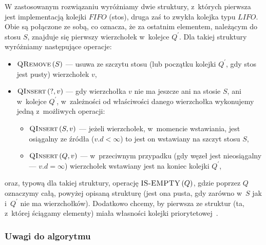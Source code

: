 W zastosowanym rozwiązaniu wyróżniamy dwie struktury, z~których pierwsza jest implementacją kolejki $FIFO$ (stos), druga zaś to zwykła kolejka typu $LIFO$. Obie są połączone ze sobą, co oznacza, że za ostatnim elementem, należącym do stosu $S$, znajduje się pierwszy wierzchołek w~kolejce $Q^{'}$. Dla takiej struktury wyróżniamy następujące operacje:

\begin{itemize}
\item $\textrm{\textsc{QRemove}} \left( S \right) $ --- usuwa ze szczytu stosu (lub początku kolejki $Q^{'}$, gdy stos jest pusty) wierzchołek $v$,
\item $\textrm{\textsc{QInsert}} \left( ?, v \right)$ --- gdy wierzchołka $v$ nie ma jeszcze ani na stosie $S$, ani w~kolejce $Q^{'}$, w~zależności od właściwości danego wierzchołka wykonujemy jedną z~możliwych operacji:
\begin{itemize}
\item $\textrm{\textsc{QInsert}} \left( S, v \right) $ --- jeżeli wierzchołek, w~momencie wstawiania, jest osiągalny ze źródła ($v.d < \infty$) to jest on wstawiany na szczyt stosu $S$,
\item $\textrm{\textsc{QInsert}} \left( Q, v \right) $ --- w~przeciwnym przypadku (gdy węzeł jest nieosiągalny --- $v.d = \infty$) wierzchołek wstawiany jest na koniec kolejki $Q^{'}$,
\end{itemize}
\end{itemize}

oraz, typową dla takiej struktury, operację $\textrm{\textsc{IS-EMPTY}} \left( Q \right) $, gdzie poprzez $Q$ oznaczymy całą, powyżej opisaną strukturę (jest ona pusta, gdy zarówno w~$S$ jak i~$Q^{'}$ nie ma wierzchołków). Dodatkowo chcemy, by pierwsza ze struktur (ta, z~której ściągamy elementy) miała własności kolejki priorytetowej~\cite[$4.$,$77$--$78$]{GIDA}.

\subsubsection{Uwagi do algorytmu}

